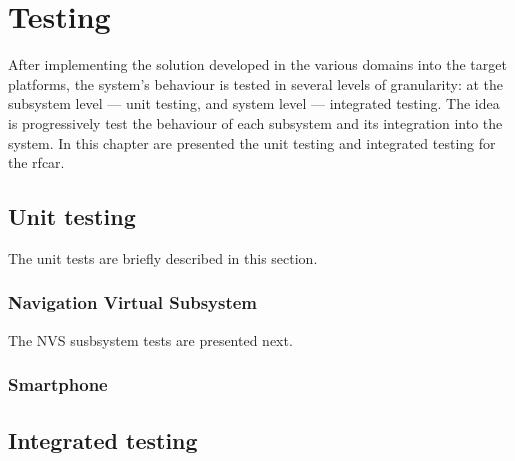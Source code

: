 \chapter{Testing}%
\label{ch:testing}
After implementing the solution developed in the various domains into the
target platforms, the system's behaviour is tested in several levels of
granularity: at the subsystem level --- unit testing, and system level ---
integrated testing. The idea is progressively test the behaviour of each
subsystem and its integration into the system.
In this chapter are presented the unit testing and integrated testing for the \gls{rfcar}.
%
\section{Unit testing}%
\label{sec:unit-testing}
The unit tests are briefly described in this section.
    \subsection{Navigation Virtual Subsystem}%
    \label{sec:navig-virt-subsyst-test}%
The NVS susbsystem tests are presented next.
    \label{sec:nvs-tests}
    
    
    \subsection{Smartphone}%
    \label{sec:smartphone-testing}
    
\section{Integrated testing}%
\label{sec:integrated-testing}

%
%
